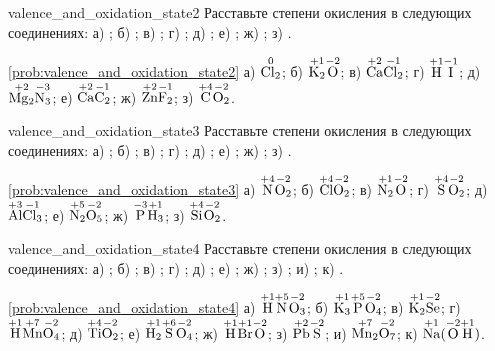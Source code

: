 \begin{problem}{}{valence_and_oxidation_state2}
    Расставьте степени окисления в следующих соединениях: а) ; б) ; в) ; г) ; д) ; е) ; ж) ; з) .
    \begin{sol}{\ref{prob:valence_and_oxidation_state2}}
        а) $\overset{0}{\ce{Cl2}}$; б) $\overset{+1}{\ce{K2}}\overset{-2}{\ce{O}}$; в) $\overset{+2}{\ce{Ca}}\overset{-1}{\ce{Cl2}}$; г) $\overset{+1}{\ce{H}}\overset{-1}{\ce{I}}$; д) $\overset{+2}{\ce{Mg2}}\overset{-3}{\ce{N3}}$; е) $\overset{+2}{\ce{Ca}}\overset{-1}{\ce{C2}}$; ж) $\overset{+2}{\ce{Zn}}\overset{-1}{\ce{F2}}$; з) $\overset{+4}{\ce{C}}\overset{-2}{\ce{O2}}$.
    \end{sol}
\end{problem}

\begin{problem}{}{valence_and_oxidation_state3}
    Расставьте степени окисления в следующих соединениях: а) ; б) ; в) ; г) ; д) ; е) ; ж) ; з) .
    \begin{sol}{\ref{prob:valence_and_oxidation_state3}}
        а) $\overset{+4}{\ce{N}}\overset{-2}{\ce{O2}}$; б) $\overset{+4}{\ce{Cl}}\overset{-2}{\ce{O2}}$; в) $\overset{+1}{\ce{N2}}\overset{-2}{\ce{O}}$; г) $\overset{+4}{\ce{S}}\overset{-2}{\ce{O2}}$; д) $\overset{+3}{\ce{Al}}\overset{-1}{\ce{Cl3}}$; е) $\overset{+5}{\ce{N2}}\overset{-2}{\ce{O5}}$; ж) $\overset{-3}{\ce{P}}\overset{+1}{\ce{H3}}$; з) $\overset{+4}{\ce{Si}}\overset{-2}{\ce{O2}}$.
    \end{sol}
\end{problem}

\begin{problem}{}{valence_and_oxidation_state4}
    Расставьте степени окисления в следующих соединениях: а) ; б) ; в) ; г) ; д) ; е) ; ж) ; з) ; и) ; к) .
    \begin{sol}{\ref{prob:valence_and_oxidation_state4}}
        а) $\overset{+1}{\ce{H}}\overset{+5}{\ce{N}}\overset{-2}{\ce{O3}}$; б) $\overset{+1}{\ce{K3}}\overset{+5}{\ce{P}}\overset{-2}{\ce{O4}}$; в) $\overset{+1}{\ce{K2}}\overset{-2}{\ce{Se}}$; г) $\overset{+1}{\ce{H}}\overset{+7}{\ce{Mn}}\overset{-2}{\ce{O4}}$; д) $\overset{+4}{\ce{Ti}}\overset{-2}{\ce{O2}}$; е) $\overset{+1}{\ce{H2}}\overset{+6}{\ce{S}}\overset{-2}{\ce{O4}}$; ж) $\overset{+1}{\ce{H}}\overset{+1}{\ce{Br}}\overset{-2}{\ce{O}}$; з) $\overset{+2}{\ce{Pb}}\overset{-2}{\ce{S}}$; и) $\overset{+7}{\ce{Mn2}}\overset{-2}{\ce{O7}}$; к) $\overset{+1}{\ce{Na}}(\overset{-2}{\ce{O}}\overset{+1}{\ce{H}})$.
    \end{sol}
\end{problem}

